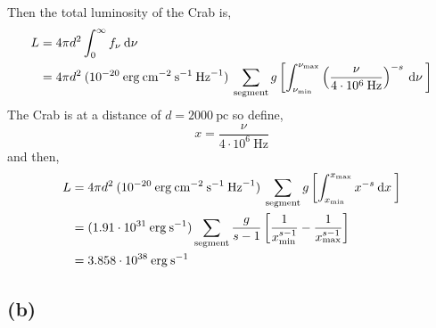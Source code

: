 \documentclass[12pt]{article}
\begin{document}
Then the total luminosity of the Crab is,
\begin{align*}
L & = 4 \pi d^2 \int_{0}^{\infty} f_\nu \: \mathrm{d}\nu \:
\\
& = 4 \pi d^2 \:  (10^{-20} \: \mathrm{erg} \: \mathrm{cm}^{-2} \: \mathrm{s}^{-1} \: \mathrm{Hz}^{-1})  \: \sum_{\text{segment}} g \left[ \int_{\nu_{\text{min}}}^{\nu_{\text{max}}}  \left( \frac{\nu}{4 \cdot 10^6 \: \mathrm{Hz}} \right)^{-s} \: \mathrm{d}\nu \: \right]
\end{align*}
The Crab is at a distance of $d = 2000 \: \mathrm{pc}$ so define,
\[ x = \frac{\nu}{4 \cdot 10^6 \: \mathrm{Hz}} \]
and then,
\begin{align*}
L & = 4 \pi d^2 \:  (10^{-20} \: \mathrm{erg} \: \mathrm{cm}^{-2} \: \mathrm{s}^{-1} \: \mathrm{Hz}^{-1})  \: \sum_{\text{segment}} g \left[ \int_{x_{\text{min}}}^{x_{\text{max}}}  x^{-s} \: \mathrm{d}x \: \right]
\\
& = (1.91 \cdot 10^{31} \: \mathrm{erg} \: \mathrm{s}^{-1}) \sum_{\text{segment}} \frac{g}{s - 1} \left[ \frac{1}{x_{\text{min}}^{s - 1}} - \frac{1}{x_{\text{max}}^{s - 1}} \right]  
\\
& = 3.858 \cdot 10^{38} \: \mathrm{erg} \: \mathrm{s}^{-1}
\end{align*}

\subsection*{(b)}
\end{document}
